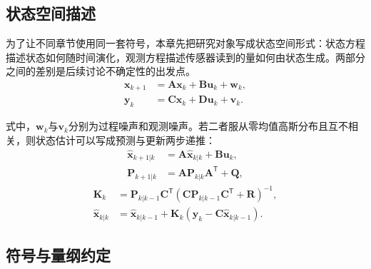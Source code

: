 \subsection{状态空间描述}\label{sec:state-space}

为了让不同章节使用同一套符号，本章先把研究对象写成状态空间形式：状态方程描述状态如何随时间演化，观测方程描述传感器读到的量如何由状态生成。两部分之间的差别是后续讨论不确定性的出发点。
\begin{equation}
  \begin{aligned}
    \bm{x}_{k+1} &= \bm{A}\bm{x}_k+\bm{B}\bm{u}_k+\bm{w}_k,\\
    \bm{y}_k &= \bm{C}\bm{x}_k+\bm{D}\bm{u}_k+\bm{v}_k .
  \end{aligned}
  \label{eq:state-space}
\end{equation}

式中，$\bm{w}_k$与$\bm{v}_k$分别为过程噪声和观测噪声。若二者服从零均值高斯分布且互不相关，则状态估计可以写成预测与更新两步递推：
\begin{equation}
  \begin{aligned}
    \hat{\bm{x}}_{k+1|k} &= \bm{A}\hat{\bm{x}}_{k|k}+\bm{B}\bm{u}_k,\\
    \bm{P}_{k+1|k} &= \bm{A}\bm{P}_{k|k}\bm{A}^{\mathsf T}+\bm{Q},
  \end{aligned}
  \label{eq:prediction}
\end{equation}
\begin{equation}
  \begin{aligned}
    \bm{K}_k &= \bm{P}_{k|k-1}\bm{C}^{\mathsf T}
      \left(\bm{C}\bm{P}_{k|k-1}\bm{C}^{\mathsf T}+\bm{R}\right)^{-1},\\
    \hat{\bm{x}}_{k|k} &= \hat{\bm{x}}_{k|k-1}
      +\bm{K}_k\left(\bm{y}_k-\bm{C}\hat{\bm{x}}_{k|k-1}\right).
  \end{aligned}
  \label{eq:update}
\end{equation}

\subsection{符号与量纲约定}

